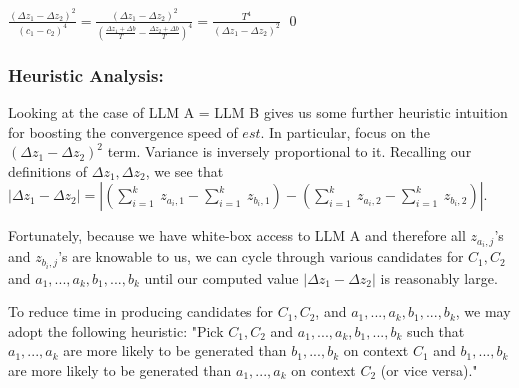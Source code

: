\documentclass{article}
\begin{document}
$\displaystyle \frac{\left( \Delta z_{1} -\Delta z_{2}\right)^{2}}{\left( c_{1} -c_{2}\right)^{4}} =\frac{\left( \Delta z_{1} -\Delta z_{2}\right)^{2}}{\left(\frac{\Delta z_{1} +\Delta b}{T} -\frac{\Delta z_{2} +\Delta b}{T}\right)^{4}} =\frac{T^{4}}{\left( \Delta z_{1} -\Delta z_{2}\right)^{2}}$ \qed 



\subsubsection*{Heuristic Analysis:}

Looking at the case of LLM A = LLM B gives us some further heuristic intuition for boosting the convergence speed of $\displaystyle est$. In particular, focus on the $\displaystyle \left( \Delta z_{1} -\Delta z_{2}\right)^{2}$ term. Variance is inversely proportional to it. Recalling our definitions of $\displaystyle \Delta z_{1} ,\Delta z_{2}$, we see that $\displaystyle |\Delta z_{1} -\Delta z_{2} |=|\left(\sum _{i=1}^{k} \ z_{a_{i} ,1} -\sum _{i=1}^{k} \ z_{b_{i} ,1}\right) -\left(\sum _{i=1}^{k} \ z_{a_{i} ,2} -\sum _{i=1}^{k} \ z_{b_{i} ,2}\right) |$.



Fortunately, because we have white-box access to LLM A and therefore all $\displaystyle z_{a_{i} ,j}$'s and $\displaystyle z_{b_{i} ,j}$'s are knowable to us, we can cycle through various candidates for $\displaystyle C_{1} ,C_{2}$ and $\displaystyle a_{1} ,...,a_{k} ,b_{1} ,...,b_{k}$ until our computed value $\displaystyle |\Delta z_{1} -\Delta z_{2} |$ is reasonably large.



To reduce time in producing candidates for $\displaystyle C_{1} ,C_{2}$, and $\displaystyle a_{1} ,...,a_{k} ,b_{1} ,...,b_{k}$, we may adopt the following heuristic: "Pick $\displaystyle C_{1} ,C_{2}$ and $\displaystyle a_{1} ,...,a_{k} ,b_{1} ,...,b_{k}$ such that $\displaystyle a_{1} ,...,a_{k}$ are more likely to be generated than $\displaystyle b_{1} ,...,b_{k}$ on context $\displaystyle C_{1}$ and $\displaystyle b_{1} ,...,b_{k}$ are more likely to be generated than $\displaystyle a_{1} ,...,a_{k}$ on context $\displaystyle C_{2}$ (or vice versa)."
\end{document}
